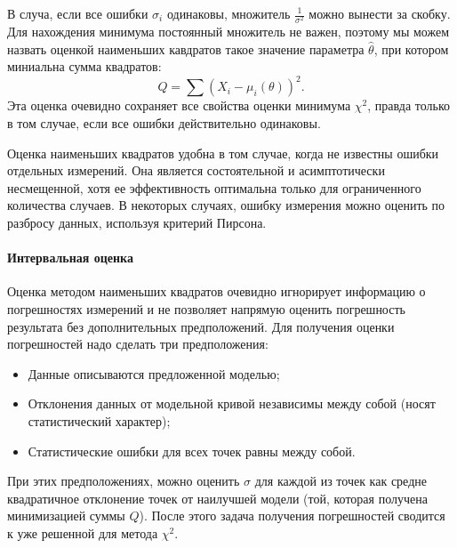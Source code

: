     В случа, если все ошибки $\sigma_i$ одинаковы, множитель
$\frac{1}{\sigma^2}$ можно вынести за скобку. Для нахождения минимума
постоянный множитель не важен, поэтому мы можем назвать оценкой
наименьших кавдратов такое значение параметра $\hat\theta$, при
котором миниальна сумма квадратов: \begin{equation}
  Q = \sum{(X_i - \mu_i(\theta))^2}.
\end{equation} Эта оценка очевидно сохраняет все свойства оценки
минимума $\chi^2$, правда только в том случае, если все ошибки
действительно одинаковы.

Оценка наименьших квадратов удобна в том случае, когда не известны
ошибки отдельных измерений. Она является состоятельной и асимптотически
несмещенной, хотя ее эффективность оптимальна только для ограниченного
количества случаев. В некоторых случаях, ошибку измерения можно оценить
по разбросу данных, используя критерий Пирсона.

\paragraph{Интервальная оценка}

Оценка методом наименьших квадратов очевидно игнорирует информацию о
погрешностях измерений и не позволяет напрямую оценить погрешность
результата без дополнительных предположений. Для получения оценки
погрешностей надо сделать три предположения:

\begin{itemize}
    \item  Данные описываются предложенной моделью;
    \item  Отклонения данных от модельной кривой независимы между собой (носят
  статистический характер);
    \item  Статистические ошибки для всех точек равны между собой.
\end{itemize}

При этих предположениях, можно оценить $\sigma$ для каждой из точек
как средне квадратичное отклонение точек от наилучшей модели (той,
которая получена минимизацией суммы $Q$). После этого задача получения
погрешностей сводится к уже решенной для метода $\chi^2$.



